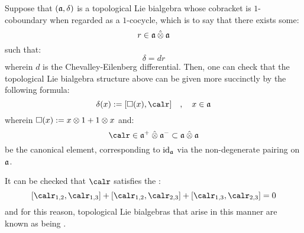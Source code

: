 
Suppose that $(\mathfrak{a}, \delta)$ is a topological Lie bialgebra whose cobracket is $1$-coboundary when regarded as a $1$-cocycle, which is to say that there exists some:
    $$r \in \a \hattensor \a$$
such that:
    $$\delta = dr$$
wherein $d$ is the Chevalley-Eilenberg differential. Then, one can check that the topological Lie bialgebra structure above can be given more succinctly by the following formula:
    \begin{equation}
        \delta(x) := [\Box(x), \calr] \quad, \quad x \in \a
    \end{equation}
wherein $\Box(x) := x \tensor 1 + 1 \tensor x$ and:
    $$\calr \in \a^+ \hattensor \a^- \subset \a \hattensor \a$$
be the canonical element, corresponding to $\mathrm{id}_{\mathfrak{a}}$ via the non-degenerate pairing on $\mathfrak{a}$.
\begin{remark}
    It can be checked that $\calr$ satisfies the :
        \begin{equation} \label{equation: CYBE}
            [\calr_{1, 2}, \calr_{1, 3}] + [\calr_{1, 2}, \calr_{2, 3}] + [\calr_{1, 3}, \calr_{2, 3}] = 0
        \end{equation}
    and for this reason, topological Lie bialgebras that arise in this manner are known as being .
\end{remark}